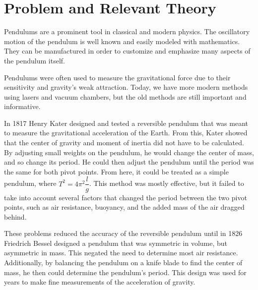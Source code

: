 %
%
%
%
\section{Problem and Relevant Theory}

Pendulums are a prominent tool in classical and modern physics. The oscillatory motion of the pendulum is well known and easily modeled with mathematics. They can be manufactured in order to customize and emphasize many aspects of the pendulum itself.
 
Pendulums were often used to measure the gravitational force due to their sensitivity and gravity's weak attraction. Today, we have more modern methods using lasers and vacuum chambers, but the old methods are still important and informative.

In 1817 Henry Kater designed and tested a reversible pendulum that was meant to measure the gravitational acceleration of the Earth. From this, Kater showed that the center of gravity and moment of inertia did not have to be calculated. By adjusting small weights on the pendulum, he would change the center of mass, and so change its period. He could then adjust the pendulum until the period was the same for both pivot points. From here, it could be treated as a simple pendulum, where $T^2 = 4\pi^2\dfrac{l}{g}$. This method was mostly effective, but it failed to take into account several factors that changed the period between the two pivot points, such as air resistance, buoyancy, and the added mass of the air dragged behind. 

These problems reduced the accuracy of the reversible pendulum until in 1826 Friedrich Bessel designed a pendulum that was symmetric in volume, but asymmetric in mass. This negated the need to determine most air resistance. Additionally, by balancing the pendulum on a knife blade to find the center of mass, he then could determine the pendulum's period. This design was used for years to make fine measurements of the acceleration of gravity.

